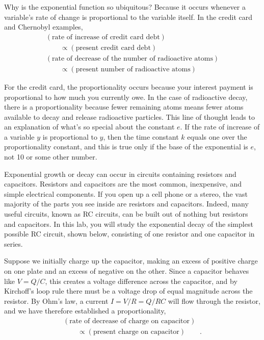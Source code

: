 Why is the exponential function so ubiquitous? Because it
occurs whenever a variable's rate of change is proportional
to the variable itself. In the credit card and Chernobyl examples,
\begin{gather*}
    (\text{rate of increase of credit card debt}) \\
    \qquad	\propto(\text{present credit card debt})    \\
    (\text{rate of decrease of the number of radioactive atoms}) \\
    \qquad	\propto(\text{present number of radioactive atoms})    
\end{gather*}

For the credit card, the proportionality occurs because your
interest payment is proportional to how much you currently
owe. In the case of radioactive decay, there is a proportionality
because fewer remaining atoms means fewer atoms available to
decay and release radioactive particles. This line of thought
leads to an explanation of what's so special about the
constant $e$. If the rate of increase of a variable $y$ is
proportional to $y$, then the time constant $k$ equals one
over the proportionality constant, and this is true only if
the base of the exponential is $e$, not 10 or some other number.

Exponential growth or decay can occur in circuits containing
resistors and capacitors. Resistors and capacitors are the
most common, inexpensive, and simple electrical components.
If you open up a cell phone or a stereo, the vast majority
of the parts you see inside are resistors and capacitors.
Indeed, many useful circuits, known as RC circuits, can be
built out of nothing but resistors and capacitors. In this
lab, you will study the exponential decay of the simplest
possible RC circuit, shown below, consisting of one resistor
and one capacitor in series.


Suppose we initially charge up the capacitor, making an
excess of positive charge on one plate and an excess of
negative on the other. Since a capacitor behaves like
$V=Q/C$, this creates a voltage difference across the
capacitor, and by Kirchoff's loop rule there must be a
voltage drop of equal magnitude across the resistor. By
Ohm's law, a current $I=V/R=Q/RC$ will flow through
the resistor, and we have therefore established a proportionality,
\begin{gather*}
    (\text{rate of decrease of charge on capacitor}) \\
    \qquad	\propto(\text{present charge on capacitor})  \qquad .  \\
\end{gather*}

